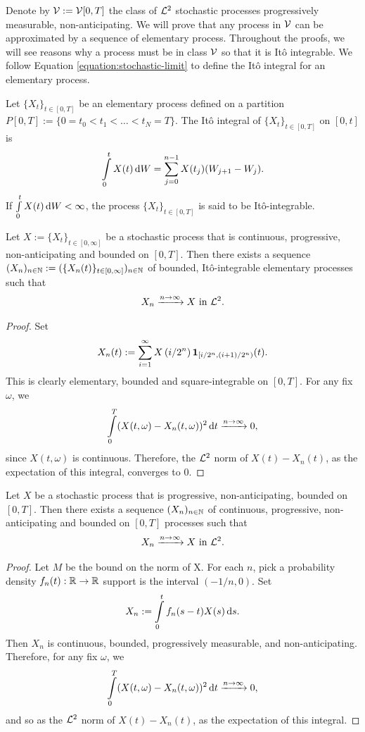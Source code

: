 Denote by $\mathcal{V} := \mathcal{V}[0,T]$ the class of $\mathcal{L}^2$ stochastic processes progressively measurable, non-anticipating. We will prove that any process in $\mathcal{V}$ can be approximated by a sequence of elementary process. Throughout the proofs, we will see reasons why a process must be in class $\mathcal{V}$ so that it is Itô integrable. We follow Equation \ref{equation:stochastic-limit} to define the Itô integral for an elementary process.

\begin{definition}
  Let $\{X_t\}_{t\in[0,T]}$ be an elementary process defined on a partition $P[0,T]:=\{0=t_0<t_1<\ldots<t_N=T\}$. The Itô integral of $\{X_t\}_{t\in[0,T]}$ on $[0,t]$ is
  $$\int\limits_0^t X(t)\,\mathrm{d} W = \sum\limits_{j=0}^{n-1} X(t_j)(W_{j+1}-W_{j}).$$
  If $\int\limits_0^t X(t)\,\mathrm{d} W < \infty$, the process $\{X_t\}_{t\in[0,T]}$ is said to be Itô-integrable.
\end{definition}

\begin{lemma}
  \label{lemma:approximation-1}
  Let $X:=\{X_t\}_{t\in[0,\infty]}$ be a stochastic process that is continuous, progressive, non-anticipating and bounded on $[0, T]$. Then there exists a sequence $(X_n)_{n\in\mathbb{N}} := (\{X_n(t)\}_{t\in[0,\infty]})_{n\in\mathbb{N}}$ of bounded, Itô-integrable elementary processes such that
  $$X_n \xrightarrow{n\to\infty} X \text{ in } \mathcal{L}^2.$$
\end{lemma}

\begin{proof}
  Set
  \begin{equation}
    X_n(t) := \sum\limits_{i=1}^\infty X\left(i/2^n\right) \mathbf{1}_{[i/2^n, (i+1)/2^n)}(t).
  \end{equation}
  This is clearly elementary, bounded and square-integrable on $[0, T]$. For any fix $\omega$, we
  $$\int\limits_0^T (X(t,\omega) - X_n(t,\omega))^2 \,\mathrm{d} t \xrightarrow{n\to\infty} 0,$$
  since $X(t,\omega)$ is continuous. Therefore, the $\mathcal{L}^2$ norm of $X(t) - X_n(t)$, as the expectation of this integral, converges to $0$.
\end{proof}

\begin{lemma}
  \label{lemma:approximation-2}
  Let $X$ be a stochastic process that is progressive, non-anticipating, bounded on $[0, T]$. Then there exists a sequence $(X_n)_{n\in\mathbb{N}}$ of continuous, progressive, non-anticipating and bounded on $[0, T]$ processes such that
  $$X_n \xrightarrow{n\to\infty} X \text{ in } \mathcal{L}^2.$$
\end{lemma}
\begin{proof}
  Let $M$ be the bound on the norm of X. For each $n$, pick a probability density $f_n(t):\mathbb{R}\to\mathbb{R}$ support is the interval $(-1/n, 0)$. Set
  $$X_n := \int\limits_0^t f_n(s-t) X(s) \,\mathrm{d} s.$$
  Then $X_n$ is continuous, bounded, progressively measurable, and non-anticipating. Therefore, for any fix $\omega$, we
  $$\int\limits_0^T (X(t,\omega) - X_n(t,\omega))^2 \,\mathrm{d} t \xrightarrow{n\to\infty} 0,$$
  and so as the $\mathcal{L}^2$ norm of $X(t) - X_n(t)$, as the expectation of this integral.
\end{proof}


